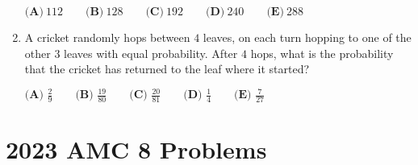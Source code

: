 \documentclass{article}
\begin{document}
\begin{enumerate}[label=\arabic*., itemsep=0.5em]
\(\textbf{(A)} ~112\qquad\textbf{(B)} ~128\qquad\textbf{(C)} ~192\qquad\textbf{(D)} ~240\qquad\textbf{(E)} ~288\)\par \vspace{0.5em}\item A cricket randomly hops between \(4\) leaves, on each turn hopping to one of the other \(3\) leaves with equal probability. After \(4\) hops, what is the probability that the cricket has returned to the leaf where it started?



\(\textbf{(A) }\frac{2}{9}\qquad\textbf{(B) }\frac{19}{80}\qquad\textbf{(C) }\frac{20}{81}\qquad\textbf{(D) }\frac{1}{4}\qquad\textbf{(E) }\frac{7}{27}\)\par \vspace{0.5em}\end{enumerate}\newpage\section*{2023 AMC 8 Problems}
\end{document}
